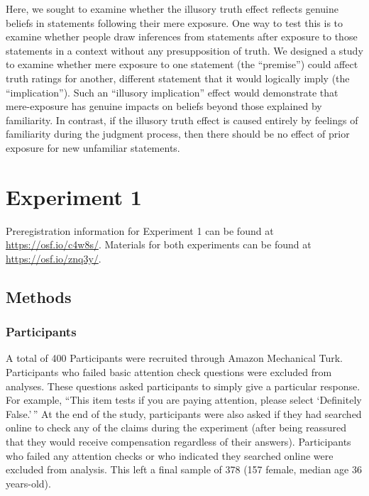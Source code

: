 \documentclass[10pt, letterpaper]{article}
\begin{document}
Here, we sought to examine whether the illusory truth effect reflects
genuine beliefs in statements following their mere exposure. One way to
test this is to examine whether people draw inferences from statements
after exposure to those statements in a context without any
presupposition of truth. We designed a study to examine whether mere
exposure to one statement (the ``premise'') could affect truth ratings
for another, different statement that it would logically imply (the
``implication''). Such an ``illusory implication'' effect would
demonstrate that mere-exposure has genuine impacts on beliefs beyond
those explained by familiarity. In contrast, if the illusory truth
effect is caused entirely by feelings of familiarity during the judgment
process, then there should be no effect of prior exposure for new
unfamiliar statements.

\hypertarget{experiment-1}{%
\section{Experiment 1}\label{experiment-1}}

Preregistration information for Experiment 1 can be found at
\url{https://osf.io/c4w8s/}. Materials for both experiments can be found
at \url{https://osf.io/znq3y/}.

\hypertarget{methods}{%
\subsection{Methods}\label{methods}}

\hypertarget{participants}{%
\subsubsection{Participants}\label{participants}}

A total of 400 Participants were recruited through Amazon Mechanical
Turk. Participants who failed basic attention check questions were
excluded from analyses. These questions asked participants to simply
give a particular response. For example, ``This item tests if you are
paying attention, please select `Definitely False.'\,'' At the end of
the study, participants were also asked if they had searched online to
check any of the claims during the experiment (after being reassured
that they would receive compensation regardless of their answers).
Participants who failed any attention checks or who indicated they
searched online were excluded from analysis. This left a final sample of
378 (157 female, median age 36 years-old).
\end{document}
